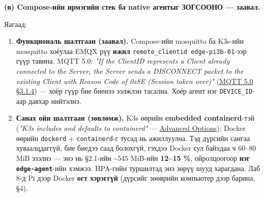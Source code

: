 \textbf{(в) Compose-ийн ирмэгийн стек ба native агентыг ЗОГСООНО --- заавал.}

\begin{Shaded}
\begin{Highlighting}[]
\KeywordTok{\&\&} 
\OperatorTok{2\textgreater{}}
\end{Highlighting}
\end{Shaded}

Яагаад:

\begin{enumerate}
\def\labelenumi{\arabic{enumi}.}
\tightlist
\item
  \textbf{Функциональ шалтгаан (заавал).} Compose-ийн mosquitto ба K3s-ийн mosquitto хоёулаа EMQX рүү \textbf{ижил} \texttt{remote\_\allowbreak{}clientid\ edge-pi3b-01}-ээр гүүр тавина. MQTT 5.0: \emph{"If the ClientID represents a Client already connected to the Server, the Server sends a DISCONNECT packet to the existing Client with Reason Code of 0x8E (Session taken over)"} (\href{https://docs.oasis-open.org/mqtt/mqtt/v5.0/os/mqtt-v5.0-os.html}{MQTT 5.0 §3.1.4}) --- хоёр гүүр бие биенээ ээлжлэн тасална. Хоёр агент нэг \texttt{DEVICE\_ID}-аар давхар нийтэлнэ.
\item
  \textbf{Санах ойн шалтгаан (зөвлөмж).} K3s өөрийн \textbf{embedded containerd}-тэй (\emph{"K3s includes and defaults to containerd"} --- \href{https://docs.k3s.io/advanced}{Advanced Options}); Docker өөрийн \texttt{dockerd} + \texttt{containerd}-г тусад нь ажиллуулна. Тэд дүрсийн сангаа хуваалцдаггүй, бие биедээ саад болохгүй, гэхдээ Docker сул байхдаа ч 60--80 MiB эзэлнэ --- энэ нь §2.1-ийн \textasciitilde545 MiB-ийн \textbf{12--15 \%}, ойролцоогоор \textbf{нэг \texttt{edge-agent}}-ийн хэмжээ. HPA-гийн туршилтад энэ зөрүү шууд харагдана. Лаб 8-д Pi дээр Docker \textbf{огт хэрэггүй} (дүрсийг зөөврийн компьютер дээр барина, §4).
\end{enumerate}


